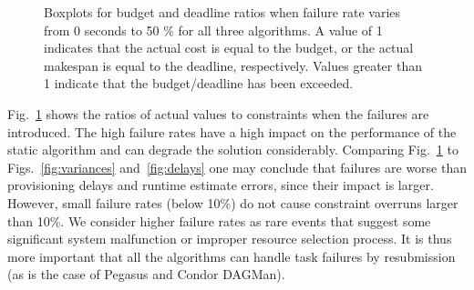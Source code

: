 \documentclass[conference]{IEEEtran}
\begin{document}
\begin{figure}[tb]
    \caption{Boxplots for budget and deadline ratios when failure rate varies
    from 0 seconds to 50 \% for all three algorithms. A value of 1
    indicates that the actual cost is equal to the budget, or the actual makespan is equal to the deadline, respectively. Values greater than 1 indicate that the budget/deadline has been exceeded.}
    \label{fig:failures}
\end{figure}

Fig.~\ref{fig:failures} shows the ratios of actual values to constraints when
the failures are introduced. The high failure rates have a high impact on the
performance of the static algorithm and can degrade the solution considerably.
Comparing Fig.~\ref{fig:failures} to Figs.~\ref{fig:variances}
and~\ref{fig:delays} one may conclude that failures are worse than
provisioning delays and runtime estimate errors, since their impact is larger.
However, small failure rates (below 10\%) do not cause constraint overruns
larger than 10\%. We consider higher failure rates as rare events that suggest
some significant system malfunction or improper resource selection
process. It is thus more important that all the algorithms can handle task
failures by resubmission (as is the case of Pegasus and Condor DAGMan).
\end{document}
